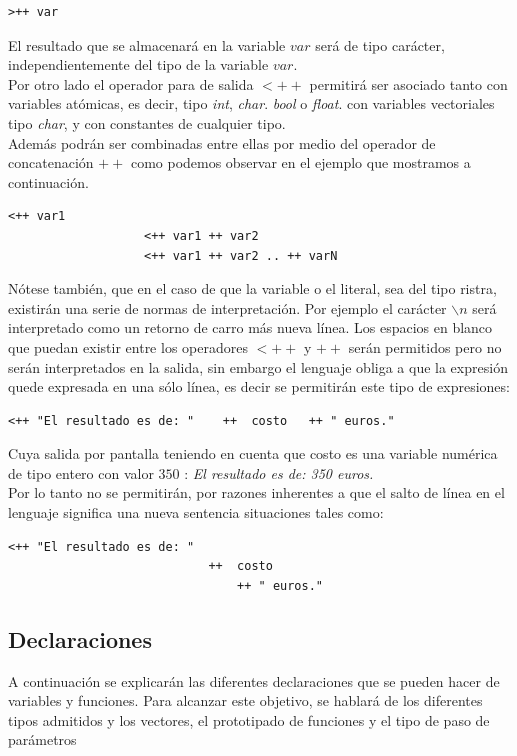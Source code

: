 \documentclass[a4paper,10pt]{article}
\begin{document}
\begin{lstlisting}[language=jam]
                   >++ var
\end{lstlisting}

El resultado que se almacenará en la variable $var$ será de tipo carácter, independientemente del tipo de la variable $var$.\\

Por otro lado el operador para de salida $<++$ permitirá ser asociado tanto con variables atómicas, es decir, tipo \emph{int}, \emph{char}. \emph{bool} o \emph{float}. con variables vectoriales tipo \emph{char}, y con constantes de cualquier tipo.\\
Además podrán ser combinadas entre ellas por medio del operador de concatenación $++$ como podemos observar en el ejemplo que mostramos a continuación. 
\begin{lstlisting}[language=jam]
                   <++ var1
                   <++ var1 ++ var2 
                   <++ var1 ++ var2 .. ++ varN 
\end{lstlisting}
Nótese también, que en el caso de que la variable o el literal, sea del tipo ristra, existirán una serie de normas de interpretación. Por ejemplo el carácter $\backslash n$ será interpretado como un retorno de carro más nueva línea. Los espacios en blanco que puedan existir entre los operadores $<++$ y $++$ serán permitidos pero no serán interpretados en la salida, sin embargo el lenguaje obliga a que la expresión quede expresada en una sólo línea, es decir se permitirán este tipo de expresiones:
\begin{lstlisting}[language=jam]
                   <++ "El resultado es de: "    ++  costo   ++ " euros."
\end{lstlisting}

Cuya salida por pantalla teniendo en cuenta que costo es una variable numérica de tipo entero con valor $350$ : \emph{El resultado es de: 350 euros.} \\
Por lo tanto no se permitirán, por razones inherentes a que el salto de línea en el lenguaje significa una nueva sentencia situaciones tales como:
\begin{lstlisting}[language=jam]
                   <++ "El resultado es de: "
				            ++  costo
						        ++ " euros."
\end{lstlisting}



\subsection{Declaraciones}
A continuación se explicarán las diferentes declaraciones que se pueden hacer de variables y funciones. Para alcanzar este objetivo, se hablará de los diferentes tipos admitidos y los vectores, el prototipado de funciones y el tipo de paso de parámetros
\end{document}
